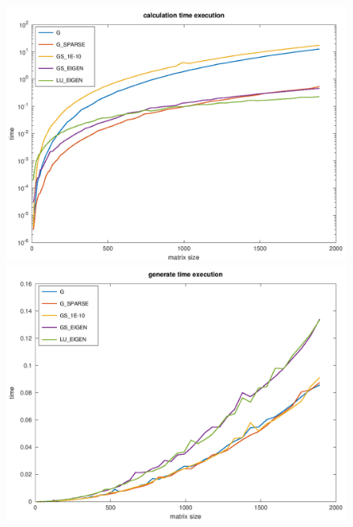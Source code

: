 \documentclass[10pt]{article}
\begin{document}
\begin{figure}[h]
\centering
\includegraphics[scale=0.40]{plots/01_calc_time_execution_all_methods.png}
\includegraphics[scale=0.40]{plots/02_gen_time_execution_all_methods.png}
\end{figure}
\end{document}
